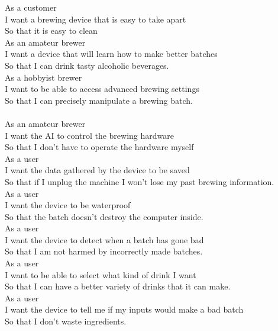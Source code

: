 \documentclass[letterpaper,10pt]{article}
\begin{document}
As a customer\\
I want a brewing device that is easy to take apart\\
So that it is easy to clean\\

As an amateur brewer\\
I want a device that will learn how to make better batches\\
So that I can drink tasty alcoholic beverages.\\

As a hobbyist brewer\\
I want to be able to access advanced brewing settings\\
So that I can precisely manipulate a brewing batch.\\
\\
As an amateur brewer\\
I want the AI to control the brewing hardware\\
So that I don't have to operate the hardware myself\\

As a user\\
I want the data gathered by the device to be saved\\
So that if I unplug the machine I won't lose my past brewing information.\\

As a user\\
I want the device to be waterproof\\
So that the batch doesn't destroy the computer inside.\\

As a user\\
I want the device to detect when a batch has gone bad\\
So that I am not harmed by incorrectly made batches.\\

As a user\\
I want to be able to select what kind of drink I want\\
So that I can have a better variety of drinks that it can make.\\

As a user\\
I want the device to tell me if my inputs would make a bad batch\\
So that I don't waste ingredients.\\
\end{document}
